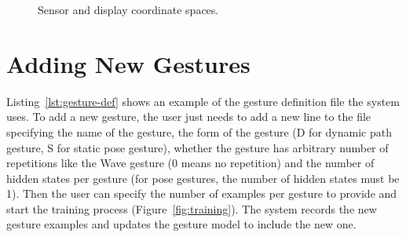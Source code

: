 \begin{figure}[tbh]
\centering
{}
\caption{Sensor and display coordinate spaces.}\label{fig:coordinate}
\end{figure}

\section{Adding New Gestures}
Listing~\ref{lst:gesture-def} shows an example of the gesture definition file
the system uses. To add a new gesture, the user just needs to add a new line to
the file specifying the name of the gesture, the form of the gesture (D for
dynamic path gesture, S for static pose gesture), whether the gesture has
arbitrary number of repetitions like the Wave gesture (0 means no repetition)
and the number of hidden states per gesture (for pose gestures, the number of hidden states must be 1).
Then the user can specify the number of examples per gesture to provide and
start the training process (Figure~\ref{fig:training}).
The system records the new gesture examples and updates the gesture model to
include the new one.

